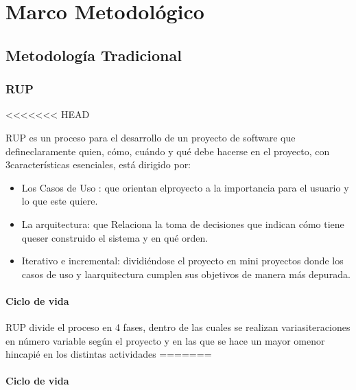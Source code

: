 \chapter{Marco Metodológico}


\section{Metodología Tradicional} 
\subsection{RUP}
<<<<<<< HEAD

 RUP es un proceso para el desarrollo de un proyecto de software que defineclaramente quien, cómo, cuándo y qué debe hacerse en el proyecto, con 3características esenciales, está dirigido por:

\begin{itemize}

    \item Los Casos de Uso : que orientan elproyecto a la importancia para el usuario y lo que este quiere. 

    \item La arquitectura: que Relaciona la toma de decisiones que indican cómo tiene queser construido el sistema y en qué orden.

    \item Iterativo e incremental: dividiéndose el proyecto en mini proyectos donde los casos de uso y laarquitectura cumplen sus objetivos de manera más depurada.

\end{itemize}


\subsubsection{Ciclo de vida}
RUP divide el proceso en 4 fases, dentro de las cuales se realizan variasiteraciones en número variable según el proyecto y en las que se hace un mayor omenor hincapié en los distintas actividades
=======
\subsubsection{Ciclo de vida}

